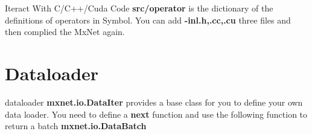 \documentclass[english, nochinese]{../TeXTemplate/pkuslide}
\begin{document}
\begin{frame}{Iteract With C/C++/Cuda Code}
\textbf{src/operator} is the dictionary of the definitions of operators in Symbol. You can add \textbf{-inl.h,.cc,.cu} three files and then complied the MxNet again.
\end{frame}

\section{Dataloader}
\begin{frame}{dataloader}
\textbf{mxnet.io.DataIter} provides a base class for you to define your own data loader. You need to define a \textbf{next} function and use the following function to return a batch \textbf{mxnet.io.DataBatch}

\end{frame}
\end{document}
